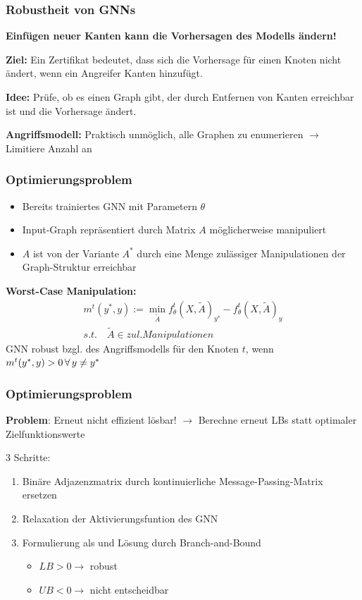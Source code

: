 \documentclass{beamer}
\begin{document}
\begin{frame}
  \frametitle{Robustheit von GNNs}

  \textbf{Einfügen neuer Kanten kann die Vorhersagen des Modells ändern!}

  \textbf{Ziel:} Ein Zertifikat bedeutet, dass sich die Vorhersage für einen Knoten
  nicht ändert, wenn ein Angreifer Kanten hinzufügt.

  \textbf{Idee:} Prüfe, ob es einen Graph gibt, der durch Entfernen von Kanten erreichbar ist und die Vorhersage ändert.

  \textbf{Angriffsmodell:} Praktisch unmöglich, alle Graphen zu enumerieren $\rightarrow$ Limitiere Anzahl an   
\end{frame}

\begin{frame}
  \frametitle{Optimierungsproblem}
  \begin{itemize}
    \item Bereits trainiertes GNN mit Parametern $\theta$
    \item Input-Graph repräsentiert durch Matrix $A$ möglicherweise manipuliert
    \item $A$ ist von der  Variante $A^{\ast}$ durch eine Menge zulässiger Manipulationen der Graph-Struktur erreichbar
  \end{itemize}
  \textbf{Worst-Case Manipulation:}
  \begin{gather}
    m^t (y^*, y) := \min_{\tilde{A}} f_{\theta}^t(X, \tilde{A})_{y^*} - f_{\theta}^t(X, \tilde{A})_y \nonumber \\
    s.t. \quad \tilde{A} \in zul. Manipulationen \nonumber
\end{gather}
  GNN robust bzgl. des Angriffsmodells für den Knoten $t$, wenn $m^t (y^*, y) > 0 \thinspace \forall \thinspace y \neq y^{\ast}$
\end{frame}

\begin{frame}
  \frametitle{Optimierungsproblem}
  \textbf{Problem}: Erneut nicht effizient lösbar!\newline
  $\rightarrow$ Berechne erneut LBs statt optimaler Zielfunktionswerte\newline

  $3$ Schritte:
  \begin{enumerate}
    \item Binäre Adjazenzmatrix durch kontinuierliche Message-Passing-Matrix ersetzen
    \item Relaxation der Aktivierungsfuntion des GNN
    \item Formulierung als  und Lösung durch Branch-and-Bound
    \begin{itemize}
      \item $LB > 0 \rightarrow$ robust
      \item $UB < 0 \rightarrow$ nicht entscheidbar
    \end{itemize}
  \end{enumerate}
\end{frame}
\end{document}

